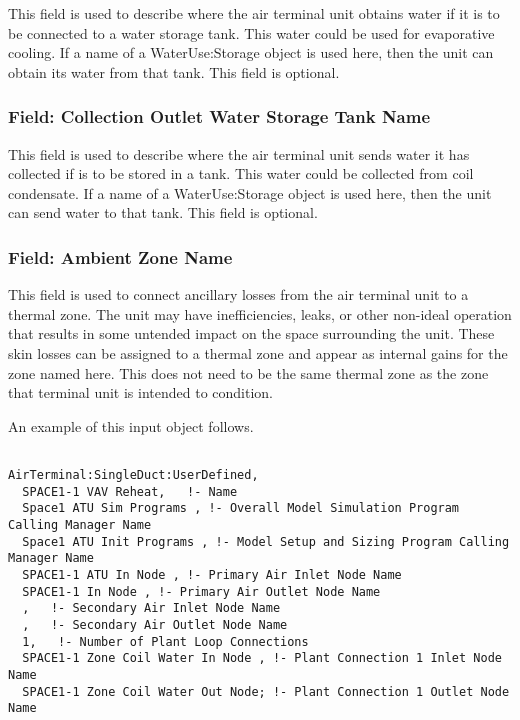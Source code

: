 This field is used to describe where the air terminal unit obtains water if it is to be connected to a water storage tank. This water could be used for evaporative cooling. If a name of a WaterUse:Storage object is used here, then the unit can obtain its water from that tank. This field is optional.

\subsubsection{Field: Collection Outlet Water Storage Tank Name}\label{field-collection-outlet-water-storage-tank-name-1}

This field is used to describe where the air terminal unit sends water it has collected if is to be stored in a tank. This water could be collected from coil condensate. If a name of a WaterUse:Storage object is used here, then the unit can send water to that tank. This field is optional.

\subsubsection{Field: Ambient Zone Name}\label{field-ambient-zone-name-1}

This field is used to connect ancillary losses from the air terminal unit to a thermal zone. The unit may have inefficiencies, leaks, or other non-ideal operation that results in some untended impact on the space surrounding the unit. These skin losses can be assigned to a thermal zone and appear as internal gains for the zone named here. This does not need to be the same thermal zone as the zone that terminal unit is intended to condition.

An example of this input object follows.

\begin{lstlisting}

AirTerminal:SingleDuct:UserDefined,
  SPACE1-1 VAV Reheat,   !- Name
  Space1 ATU Sim Programs , !- Overall Model Simulation Program Calling Manager Name
  Space1 ATU Init Programs , !- Model Setup and Sizing Program Calling Manager Name
  SPACE1-1 ATU In Node , !- Primary Air Inlet Node Name
  SPACE1-1 In Node , !- Primary Air Outlet Node Name
  ,   !- Secondary Air Inlet Node Name
  ,   !- Secondary Air Outlet Node Name
  1,   !- Number of Plant Loop Connections
  SPACE1-1 Zone Coil Water In Node , !- Plant Connection 1 Inlet Node Name
  SPACE1-1 Zone Coil Water Out Node; !- Plant Connection 1 Outlet Node Name
\end{lstlisting}


